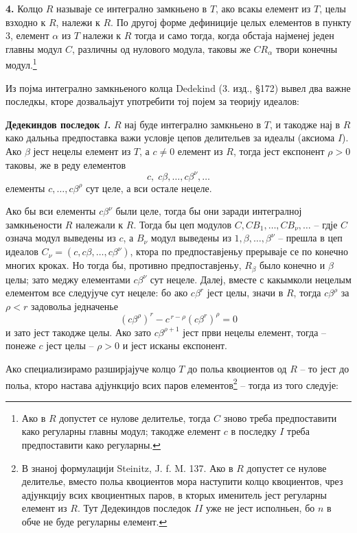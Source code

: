 ﻿\documentclass[11pt]{article}
\begin{document}
\textbf{4.} Колцо $R$ называје се интегрално замкньено в $T$, ако всакы елемент из $T$, целы взходно к $R$, належи к $R$. По другој форме дефиниције целых елементов в пункту 3, елемент $\alpha$ из $T$ належи к $R$ тогда и само тогда, когда обстаја најменеј једен главны модул $C$, различны од нулового модула, таковы же $CR_\alpha$ твори конечны модул.\footnote{Ако в $R$ допустет се нулове делителье, тогда $C$ зново треба предпоставити како регуларны главны модул; такодже елемент $c$ в последку $I$ треба предпоставити како регуларны.}

Из појма интегрално замкньеного колца Dedekind (3. изд., §172) вывел два важне последкы, кторе дозвальајут употребити тој појем за теорију идеалов:

\medskip
\noindent\textbf{Дедекиндов последок $I$.} $R$ нај буде интегрално замкньено в $T$, и такодже нај в $R$ како дальньа предпоставка важи условје цепов делительев за идеалы (аксиома $I$). Ако $\beta$ јест нецелы елемент из $T$, а $c\ne0$ елемент из $R$, тогда јест експонент $\rho>0$ таковы, же в реду елементов
\[
        c,\;c\beta,\ldots,c\beta^\nu,\ldots
\]
елементы $c,\ldots,c\beta^\rho$ сут целе, а вси остале нецеле.

Ако бы вси елементы $c\beta^\nu$ были целе, тогда бы они заради интегралној замкньености $R$ належали к $R$. Тогда бы цеп модулов $C,CB_1,\ldots,CB_\nu,\ldots$ -- гдје $C$ означа модул выведены из $c$, а $B_\nu$ модул выведены из $1,\beta,\ldots,\beta^\nu$ -- прешла в цеп идеалов $C_\nu=(c,c\beta,\ldots,c\beta^\nu)$, ктора по предпоставјеньу прерываје се по конечно многих кроках. Но тогда бы, противно предпоставјеньу, $R_\beta$ было конечно и $\beta$ целы; зато меджу елементами $c\beta^\nu$ сут нецеле. Далеј, вместе с какымколи нецелым елементом все следујуче сут нецеле: бо ако $c\beta^r$ јест целы, значи в $R$, тогда $c\beta^\rho$ за $\rho<r$ задовольа једначенье
\[
        (c\beta^\rho)^r-c^{\,r-\rho}(c\beta^r)^\rho=0
\]
и зато јест такодже целы. Ако зато $c\beta^{\rho+1}$ јест први нецелы елемент, тогда -- понеже $c$ јест целы -- $\rho>0$ и јест исканы експонент.

Ако специализирамо разширјајуче колцо $T$ до польа квоциентов од $R$ -- то јест до польа, кторо настава адјункцијо всих паров елементов\footnote{В знаној формулацији Steinitz, J. f. M. 137. Ако в $R$ допустет се нулове делителье, вместо польа квоциентов мора наступити колцо квоциентов, чрез адјункцију всих квоциентных паров, в кторых именитель јест регуларны елемент из $R$. Тут Дедекиндов последок $II$ уже не јест исполньен, бо $n$ в обче не буде регуларны елемент.} -- тогда из того следује:
\end{document}
